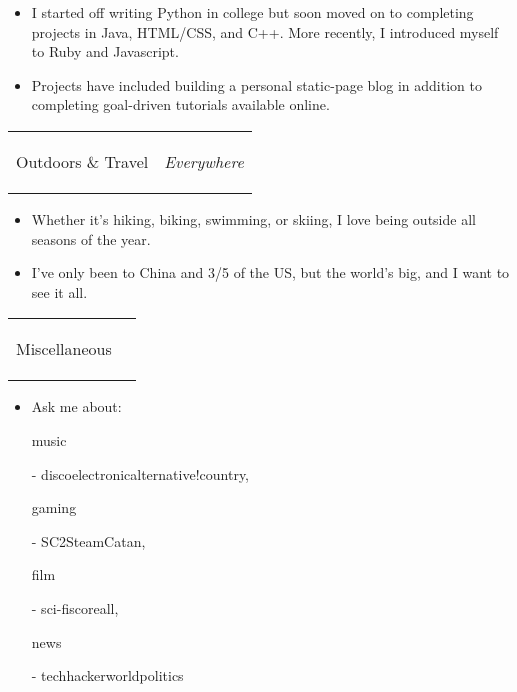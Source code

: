 \documentclass[11pt]{article}
\makeatletter
\newcommand{\headerrow}[2]
{\begin{tabular*}{\linewidth}{l@{\extracolsep{\fill}}r}
	#1 &
	#2 \\
\end{tabular*}}
\makeatother
\begin{document}
\vspace{-1.0em}
\begin{itemize}
	\item I started off writing Python in college but soon moved on to completing projects in Java, HTML/CSS, and C++. More recently, I introduced myself to Ruby and Javascript. 
	\vspace{-0.5em}
	\item Projects have included building a personal static-page blog in addition to completing goal-driven tutorials available online. 
\end{itemize}

\vspace{-0.5em}

\headerrow
	{\begin{Large}Outdoors \& Travel\end{Large}}
	{\textit{Everywhere}}
	
\vspace{-1.0em}
\begin{itemize}
	\item Whether it's hiking, biking, swimming, or skiing, I love being outside all seasons of the year.
	\vspace{-1.7em}
	\item I've only been to China and 3/5 of the US, but the world's big, and I want to see it all.
\end{itemize}

\vspace{-0.5em}

\headerrow
	{\begin{Large}Miscellaneous\end{Large}}
	{}
	
\vspace{-1.0em}

\begin{itemize}
	\item Ask me about: \begin{bf}music\end{bf} - disco\textbar electronic\textbar alternative\textbar !country, \begin{bf}gaming\end{bf} - SC2\textbar Steam\textbar Catan, \begin{bf}film\end{bf} - sci-fi\textbar score\textbar all, \begin{bf}news\end{bf} - tech\textbar hacker\textbar world\textbar politics
\end{itemize}
\end{document}
